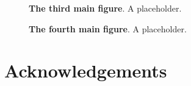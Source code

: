 \documentclass[]{article}
\begin{document}
\begin{figure}[ht]
\begin{center}
    \makebox[\textwidth][c]{} %
\caption{\textbf{The third main figure}.
    A placeholder.
}
\label{fig:r3}
\end{center}
\end{figure}

\begin{figure}[ht]
\begin{center}
    \makebox[\textwidth][c]{} %
\caption{\textbf{The fourth main figure}.
    A placeholder.
}
\label{fig:r4}
\end{center}
\end{figure}

\section*{Acknowledgements}

\break



\end{document}
